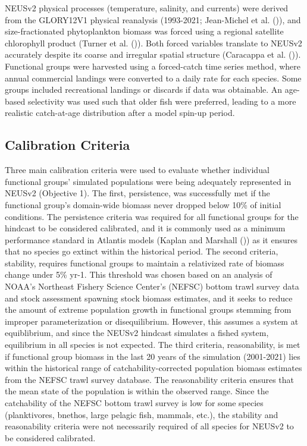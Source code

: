 \documentclass[
]{article}
\begin{document}
NEUSv2 physical processes (temperature, salinity, and currents) were derived from the GLORY12V1 physical reanalysis (1993-2021; Jean-Michel et al. ()), and size-fractionated phytoplankton biomass was forced using a regional satellite chlorophyll product (Turner et al. ()). Both forced variables translate to NEUSv2 accurately despite its coarse and irregular spatial structure (Caracappa et al. ()). Functional groups were harvested using a forced-catch time series method, where annual commercial landings were converted to a daily rate for each species. Some groups included recreational landings or discards if data was obtainable. An age-based selectivity was used such that older fish were preferred, leading to a more realistic catch-at-age distribution after a model spin-up period.

\subsection{Calibration Criteria}\label{calibration-criteria}

Three main calibration criteria were used to evaluate whether individual functional groups' simulated populations were being adequately represented in NEUSv2 (Objective 1). The first, persistence, was successfully met if the functional group's domain-wide biomass never dropped below 10\% of initial conditions. The persistence criteria was required for all functional groups for the hindcast to be considered calibrated, and it is commonly used as a minimum performance standard in Atlantis models (Kaplan and Marshall ()) as it ensures that no species go extinct within the historical period. The second criteria, stability, requires functional groups to maintain a relativized rate of biomass change under 5\% yr-1. This threshold was chosen based on an analysis of NOAA's Northeast Fishery Science Center's (NEFSC) bottom trawl survey data and stock assessment spawning stock biomass estimates, and it seeks to reduce the amount of extreme population growth in functional groups stemming from improper parameterization or disequilibrium. However, this assumes a system at equiblibrium, and since the NEUSv2 hindcast simulates a fished system, equilibrium in all species is not expected. The third criteria, reasonability, is met if functional group biomass in the last 20 years of the simulation (2001-2021) lies within the historical range of catchability-corrected population biomass estimates from the NEFSC trawl survey database. The reasonability criteria ensures that the mean state of the population is within the observed range. Since the catchability of the NEFSC bottom trawl survey is low for some species (planktivores, bnethos, large pelagic fish, mammals, etc.), the stability and reasonability criteria were not necessarily required of all species for NEUSv2 to be considered calibrated.
\end{document}
